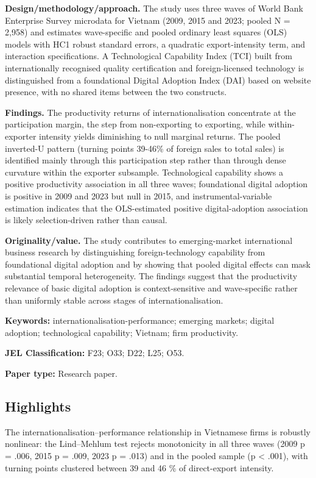 \documentclass[12pt,a4paper]{article}
\begin{document}
\textbf{Design/methodology/approach.} The study uses three waves of
World Bank Enterprise Survey microdata for Vietnam (2009, 2015 and 2023;
pooled N = 2,958) and estimates wave-specific and pooled ordinary least
squares (OLS) models with HC1 robust standard errors, a quadratic
export-intensity term, and interaction specifications. A Technological
Capability Index (TCI) built from internationally recognised quality
certification and foreign-licensed technology is distinguished from a
foundational Digital Adoption Index (DAI) based on website presence,
with no shared items between the two constructs.

\textbf{Findings.} The productivity returns of internationalisation
concentrate at the participation margin, the step from non-exporting to
exporting, while within-exporter intensity yields diminishing to null
marginal returns. The pooled inverted-U pattern (turning points 39-46\%
of foreign sales to total sales) is identified mainly through this
participation step rather than through dense curvature within the
exporter subsample. Technological capability shows a positive
productivity association in all three waves; foundational digital
adoption is positive in 2009 and 2023 but null in 2015, and
instrumental-variable estimation indicates that the OLS-estimated
positive digital-adoption association is likely selection-driven rather
than causal.

\textbf{Originality/value.} The study contributes to emerging-market
international business research by distinguishing foreign-technology
capability from foundational digital adoption and by showing that pooled
digital effects can mask substantial temporal heterogeneity. The
findings suggest that the productivity relevance of basic digital
adoption is context-sensitive and wave-specific rather than uniformly
stable across stages of internationalisation.

\textbf{Keywords:} internationalisation-performance; emerging markets;
digital adoption; technological capability; Vietnam; firm productivity.

\textbf{JEL Classification:} F23; O33; D22; L25; O53.

\textbf{Paper type:} Research paper.

\hypertarget{highlights}{%
\subsection{Highlights}\label{highlights}}

The internationalisation--performance relationship in Vietnamese firms
is robustly nonlinear: the Lind--Mehlum test rejects monotonicity in all
three waves (2009 p = .006, 2015 p = .009, 2023 p = .013) and in the
pooled sample (p \textless{} .001), with turning points clustered
between 39 and 46 \% of direct-export intensity.
\end{document}
